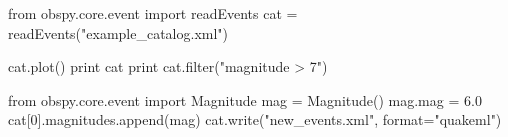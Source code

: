 \documentclass[10pt]{article}
\begin{document}
\begin{python}
from obspy.core.event import readEvents
cat = readEvents("example_catalog.xml")

cat.plot()
print cat
print cat.filter("magnitude > 7")

from obspy.core.event import Magnitude
mag = Magnitude()
mag.mag = 6.0
cat[0].magnitudes.append(mag)
cat.write("new_events.xml", format="quakeml")
\end{python}
\end{document}
